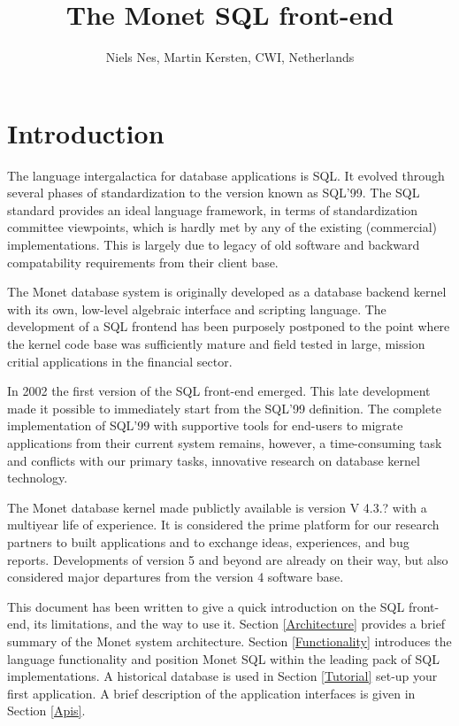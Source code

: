 \documentclass[10pt,twocolumn,fleqn]{article}
\begin{document}
\title{The Monet SQL front-end}
\author{ Niels Nes, Martin Kersten, {\small \textsc{CWI}, Netherlands}}
\date{}
\maketitle

\section{Introduction}
The language intergalactica for database applications is SQL. It evolved
through several phases of standardization to the version known as SQL'99.
The SQL standard provides an ideal language framework, 
in terms of standardization committee viewpoints, 
which is hardly met by any of the existing (commercial) implementations.
This is largely due to legacy of old software and backward compatability
requirements from their client base.
 
The Monet database system is originally developed as a database backend
kernel with its own, low-level algebraic interface and scripting language.
The development of a SQL frontend has been purposely postponed to the point
where the kernel code base was sufficiently mature and field tested in
large, mission critial applications in the financial sector.

In 2002 the first version of the SQL front-end emerged. 
This late development made it possible to immediately start from the SQL'99
definition. The complete implementation of SQL'99 with supportive
tools for end-users to migrate applications from their current system
remains, however, a time-consuming task and conflicts with our primary tasks,
innovative research on database kernel technology.

The Monet database kernel made publictly available is version V 4.3.?
with a multiyear life of experience. It is considered the prime platform
for our research partners to built applications and to exchange
ideas, experiences, and bug reports. Developments of version 5 and beyond
are already on their way, but also considered major departures from
the version 4 software base.

This document has been written to give a quick introduction on the SQL
front-end, its limitations, and the way to use it. 
Section \ref{Architecture}  provides a brief summary of the Monet
system architecture.
Section \ref{Functionality} introduces the language functionality and
position Monet SQL within the leading pack of SQL implementations.
A historical database is used in Section \ref{Tutorial}
set-up your first application.
A brief description of the application interfaces is given in Section \ref{Apis}.
\end{document}
